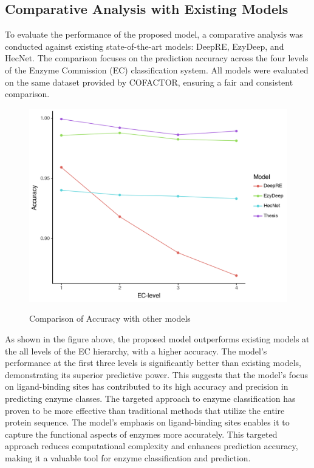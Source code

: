 \subsection{Comparative Analysis with Existing Models}
\label{sec:Comparative Analysis with Existing Models}

To evaluate the performance of the proposed model, a comparative analysis was conducted against existing state-of-the-art models: DeepRE, EzyDeep, and HecNet. The comparison focuses on the prediction accuracy across the four levels of the Enzyme Commission (EC) classification system. All models were evaluated on the same dataset provided by COFACTOR, ensuring a fair and consistent comparison. \autocite{zhangCOFACTORImprovedProtein2017}

\begin{figure}[hbt]
    \centering
    \begin{minipage}[t]{\textwidth}
    \caption{Comparison of Accuracy with other models}
    \includegraphics[width=1\textwidth]{img/comparison-with-other-models.png}
    \label{fig:comparison-with-other-models}
    \end{minipage}
\end{figure}

As shown in the figure above, the proposed model outperforms existing models at the all levels of the EC hierarchy, with a higher accuracy. The model's performance at the first three levels is significantly better than existing models, demonstrating its superior predictive power. This suggests that the model's focus on ligand-binding sites has contributed to its high accuracy and precision in predicting enzyme classes. The targeted approach to enzyme classification has proven to be more effective than traditional methods that utilize the entire protein sequence. The model's emphasis on ligand-binding sites enables it to capture the functional aspects of enzymes more accurately. This targeted approach reduces computational complexity and enhances prediction accuracy, making it a valuable tool for enzyme classification and prediction.

